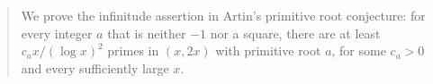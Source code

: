 \begin{abstract}
We prove the infinitude assertion in Artin's primitive root conjecture:
for every integer $a$ that is neither $-1$ nor a square, there are
at least $c_a x/(\log x)^2$ primes in $(x,2x)$ with primitive root $a$,
for some $c_a>0$ and every sufficiently large $x$.
\end{abstract}
